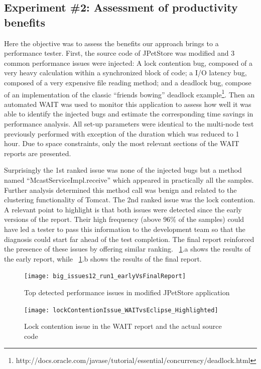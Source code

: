 \documentclass[runningheads,a4paper]{llncs}
\begin{document}
\vspace{-5pt}
\subsection{Experiment \#2: Assessment of productivity benefits}
\vspace{-2pt}

Here the objective was to assess the benefits our approach brings to a
performance tester. First, the source code of JPetStore was modified and 3
common performance issues were injected: A lock contention bug, composed of a
very heavy calculation within a synchronized block of code; a I/O latency bug, 
composed of a very expensive file reading method; and a deadlock bug, compose
of an implementation of the classic ``friends bowing'' deadlock
example\footnote{http://docs.oracle.com/javase/tutorial/essential/concurrency/deadlock.html}.
Then an automated WAIT was used to monitor this application to assess how well
it was able to identify the injected bugs and estimate the corresponding time
savings in performance analysis. All set-up parameters were identical to
the multi-node test previously performed with exception of the duration which
was reduced to 1 hour. Due to space constraints, only the most relevant sections
of the WAIT reports are presented.

Surprisingly the 1st ranked issue was none of the injected bugs but a method
named ``McastServiceImpl.receive'' which appeared in practically all the
samples. Further analysis determined this method call was benign and related
to the clustering functionality of Tomcat. The 2nd ranked issue was the lock
contention. A relevant point to highlight is that both issues were detected
since the early versions of the report. Their high frequency (above
96\% of the samples) could have led a tester to pass this
information to the development team so that the diagnosis could start far ahead
of the test completion. The final report reinforced the presence of these issues 
by offering similar ranking. \figurename ~\ref{fig_run1_bugs12}.a shows the
results of the early report, while ~\ref{fig_run1_bugs12}.b shows the results of the final report.

\begin{figure}[!h]
\centering
\texttt{[image: big\_issues12\_run1\_earlyVsFinalReport]}
\caption{Top detected performance issues in modified JPetStore application}
\label{fig_run1_bugs12}
\end{figure}

\begin{figure}[!h]
\centering
\texttt{[image: lockContentionIssue\_WAITvsEclipse\_Highlighted]}
\caption{Lock contention issue in the WAIT report and the actual source code}
\label{fig_issue2_vs_code}
\end{figure}
\end{document}
